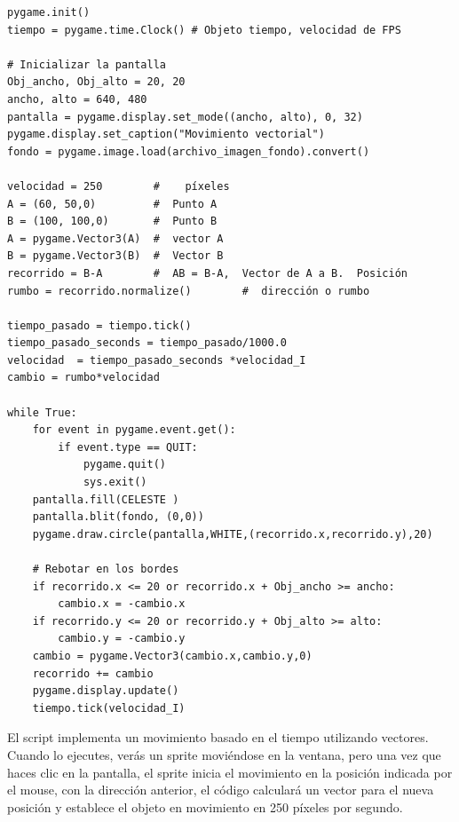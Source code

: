 {\begin{lstlisting}
pygame.init()
tiempo = pygame.time.Clock() # Objeto tiempo, velocidad de FPS

# Inicializar la pantalla
Obj_ancho, Obj_alto = 20, 20
ancho, alto = 640, 480
pantalla = pygame.display.set_mode((ancho, alto), 0, 32)
pygame.display.set_caption("Movimiento vectorial")
fondo = pygame.image.load(archivo_imagen_fondo).convert()

velocidad = 250  	   #    píxeles  
A = (60, 50,0)         #  Punto A
B = (100, 100,0)       #  Punto B
A = pygame.Vector3(A)  #  vector A
B = pygame.Vector3(B)  #  Vector B
recorrido = B-A        #  AB = B-A,  Vector de A a B.  Posición
rumbo = recorrido.normalize()        #  dirección o rumbo

tiempo_pasado = tiempo.tick()
tiempo_pasado_seconds = tiempo_pasado/1000.0
velocidad  = tiempo_pasado_seconds *velocidad_I
cambio = rumbo*velocidad      

while True:
    for event in pygame.event.get():
        if event.type == QUIT:
            pygame.quit()
            sys.exit()
    pantalla.fill(CELESTE )
    pantalla.blit(fondo, (0,0))
    pygame.draw.circle(pantalla,WHITE,(recorrido.x,recorrido.y),20)

    # Rebotar en los bordes
    if recorrido.x <= 20 or recorrido.x + Obj_ancho >= ancho:
        cambio.x = -cambio.x       
    if recorrido.y <= 20 or recorrido.y + Obj_alto >= alto:
        cambio.y = -cambio.y
    cambio = pygame.Vector3(cambio.x,cambio.y,0)
    recorrido += cambio   
    pygame.display.update()
    tiempo.tick(velocidad_I)
\end{lstlisting}

El script implementa un movimiento basado en el tiempo utilizando vectores. 
Cuando lo ejecutes, verás un sprite moviéndose  en la ventana, pero una vez que haces clic en la pantalla, el sprite inicia el movimiento en la posición indicada por el mouse, con la dirección anterior,  el código calculará un vector para el nueva posición y establece el objeto en movimiento en 250 píxeles por segundo.


\hspace{-2.8cm}{\ttfamily \scriptsize posic\_mous}

}
